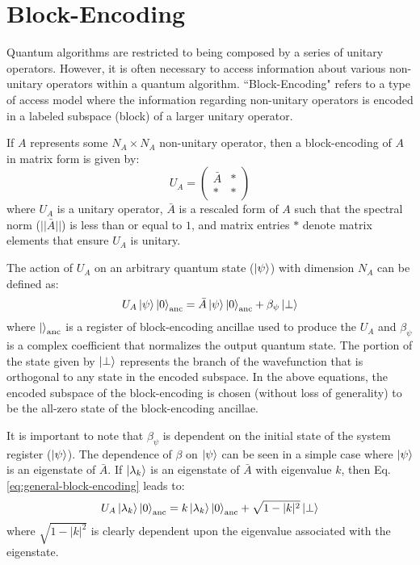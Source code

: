 \section{Block-Encoding}
\label{sec:block-encoding}

Quantum algorithms are restricted to being composed by a series of unitary operators.
However, it is often necessary to access information about various non-unitary operators within a quantum algorithm.
``Block-Encoding" refers to a type of access model where the information regarding non-unitary operators is encoded in a labeled subspace (block) of a larger unitary operator.

If $A$ represents some $N_A \times N_A$ non-unitary operator, then a block-encoding of $A$ in matrix form is given by:
\begin{equation}
    U_A = 
    \begin{pmatrix}
    \bar{A} & * \\
    * & * 
    \end{pmatrix}
\end{equation}
where $U_A$ is a unitary operator, $\bar{A}$ is a rescaled form of $A$ such that the spectral norm ($||\bar{A}||$) is less than or equal to $1$, and matrix entries $*$ denote matrix elements that ensure $U_A$ is unitary.

The action of $U_A$ on an arbitrary quantum state ($\ket{\psi}$) with dimension $N_A$ can be defined as:
\begin{equation}
    \label{eq:general-block-encoding}
    U_A \ket{\psi} \ket{0}_{\text{anc}} = \bar{A} \ket{\psi} \ket{0}_{\text{anc}} + \beta_\psi \ket{\perp}
\end{equation}
where $\ket{}_{\text{anc}}$ is a register of block-encoding ancillae used to produce the $U_A$ and $\beta_\psi$ is a complex coefficient that normalizes the output quantum state.
The portion of the state given by $\ket{\perp}$ represents the branch of the wavefunction that is orthogonal to any state in the encoded subspace.
In the above equations, the encoded subspace of the block-encoding is chosen (without loss of generality) to be the all-zero state of the block-encoding ancillae.

It is important to note that $\beta_\psi$ is dependent on the initial state of the system register ($\ket{\psi}$).
The dependence of $\beta$ on $\ket{\psi}$ can be seen in a simple case where $\ket{\psi}$ is an eigenstate of $\bar{A}$.
If $\ket{\lambda_k}$ is an eigenstate of $\bar{A}$ with eigenvalue $k$, then Eq. \ref{eq:general-block-encoding} leads to:
\begin{equation}
    U_A \ket{\lambda_k} \ket{0}_{\text{anc}} = k \ket{\lambda_k} \ket{0}_{\text{anc}} + \sqrt{1 - |k|^2} \ket{\perp}
\end{equation}
where $\sqrt{1 - |k|^2}$ is clearly dependent upon the eigenvalue associated with the eigenstate.

